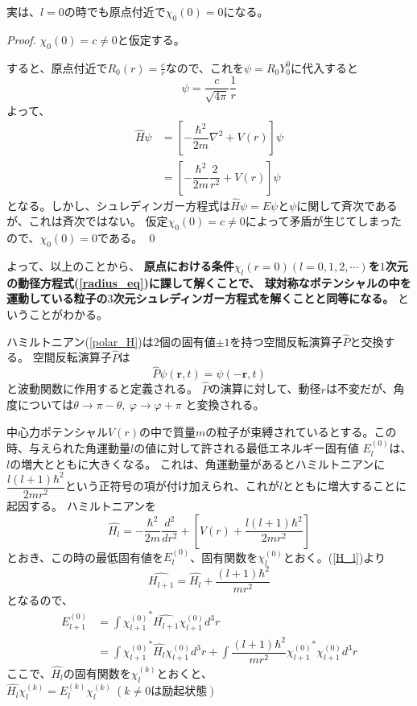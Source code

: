 実は、$l=0$の時でも原点付近で$\chi_0(0) = 0$になる。
\begin{proof}
	$\chi_0(0) = c \neq 0$と仮定する。

	すると、原点付近で$R_0(r) = \frac{c}{r}$なので、これを$\psi = R_0Y_0^0$に代入すると
	\begin{equation}
		\psi = \dfrac{c}{\sqrt{4\pi}}\dfrac{1}{r}
	\end{equation}
	よって、
	\begin{align}
		\hat{H}\psi &= \left[-\dfrac{\hbar^2}{2m}\nabla^2 + V(r)\right]\psi \\
		&= \left[ -\dfrac{\hbar^2}{2m}\dfrac{2}{r^2} + V(r)\right]\psi
	\end{align}
	となる。しかし、シュレディンガー方程式は$\hat{H}\psi = E\psi$と$\psi$に関して斉次であるが、これは斉次ではない。
	仮定$\chi_0(0) = c \neq 0$によって矛盾が生じてしまったので、$\chi_0(0) = 0$である。
	\qed
\end{proof}

よって、以上のことから、
{\bf 原点における条件$\chi_l(r = 0)(l = 0,1,2,\cdots)$を$1$次元の動径方程式(\ref{radius_eq})に課して解くことで、
球対称なポテンシャルの中を運動している粒子の$3$次元シュレディンガー方程式を解くことと同等になる。}
ということがわかる。

ハミルトニアン(\ref{polar_H})は$2$個の固有値$\pm1$を持つ空間反転演算子$\hat{P}$と交換する。
空間反転演算子$\hat{P}$は
\begin{equation}
	\hat{P}\psi(\bm{r},t) = \psi(-\bm{r},t)
\end{equation}
と波動関数に作用すると定義される。
$\hat{P}$の演算に対して、動径$r$は不変だが、角度については$\theta \to \pi - \theta,~\varphi \to \varphi + \pi$
と変換される。

中心力ポテンシャル$V(r)$の中で質量$m$の粒子が束縛されているとする。この時、与えられた角運動量$l$の値に対して許される最低エネルギー固有値
$E_l^{(0)}$は、$l$の増大とともに大きくなる。
これは、角運動量があるとハミルトニアンに$\dfrac{l(l+1)\hbar^2}{2mr^2}$という正符号の項が付け加えられ、これが$l$とともに増大することに起因する。
ハミルトニアンを
\begin{equation}
	\label{H_l}
	\hat{H_l} = -\dfrac{\hbar^2}{2m}\dfrac{d^2}{dr^2} + \left[ V(r) + \dfrac{l(l+1)\hbar^2}{2mr^2} \right]
\end{equation}
とおき、この時の最低固有値を$E_l^{(0)}$、固有関数を$\chi_l^{(0)}$とおく。(\ref{H_l})より
\begin{equation}
	\hat{H_{l+1}} = \hat{H_l} + \dfrac{(l+1)\hbar^2}{mr^2}
\end{equation}
となるので、
\begin{align}
	E_{l+1}^{(0)}
	&= \int {\chi_{l+1}^{(0)}}^* \hat{H_{l+1}} \chi_{l+1}^{(0)} d^3r \\
	\label{chiHchi}
	&= \int {\chi_{l+1}^{(0)}}^* \hat{H_l} \chi_{l+1}^{(0)} d^3r + \int \dfrac{(l+1)\hbar^2}{mr^2} {\chi_{l+1}^{(0)}}^* \chi_{l+1}^{(0)} d^3r
\end{align}
ここで、$\hat{H_l}$の固有関数を$\chi_l^{(k)}$とおくと、$\hat{H_l}\chi_l^{(k)} = E_l^{(k)}\chi_l^{(k)}~(k\neq 0は励起状態)$

